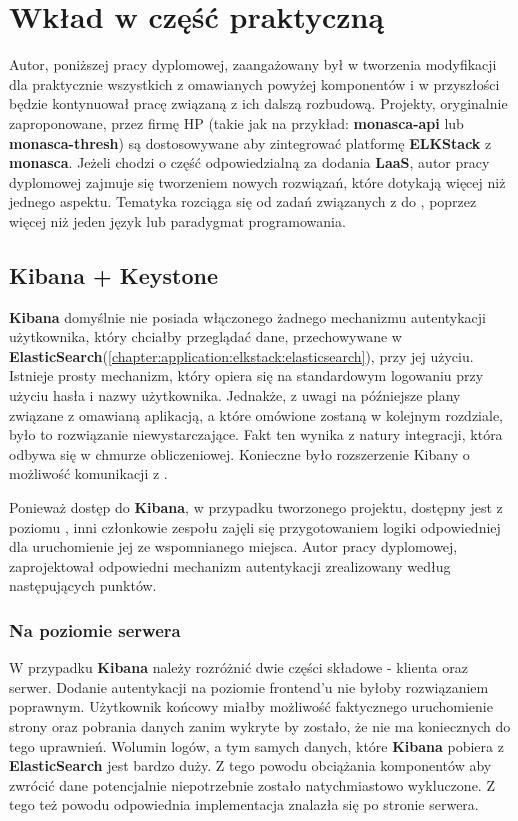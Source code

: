 \section{Wkład w część praktyczną}
\label{chapter:application:own_work}

Autor, poniższej pracy dyplomowej, zaangażowany był w tworzenia modyfikacji dla praktycznie wszystkich z omawianych powyżej komponentów i w przyszłości będzie kontynuował pracę związaną z ich dalszą rozbudową.
Projekty, oryginalnie zaproponowane, przez firmę HP (takie jak na przykład: \textbf{monasca-api} lub \textbf{monasca-thresh})
są dostosowywane aby zintegrować platformę \textbf{ELKStack} z \textbf{monasca}.
Jeżeli chodzi o część odpowiedzialną za dodania \textbf{LaaS}, autor pracy dyplomowej zajmuje się
tworzeniem nowych rozwiązań, które dotykają więcej niż jednego aspektu. Tematyka rozciąga się
od zadań związanych z  
do , poprzez więcej niż jeden język lub paradygmat programowania.

\subsection{Kibana + Keystone}
\label{chapter:application:own_work:kibana_and_keystone}

\textbf{Kibana} domyślnie nie posiada włączonego żadnego mechanizmu autentykacji użytkownika, który
chciałby przeglądać dane, przechowywane w \textbf{ElasticSearch}(\ref{chapter:application:elkstack:elasticsearch}), 
przy jej użyciu. Istnieje prosty mechanizm, który opiera się na standardowym logowaniu przy użyciu
hasła i nazwy użytkownika. Jednakże, z uwagi na późniejsze plany związane z omawianą aplikacją, a które 
omówione zostaną w kolejnym rozdziale, było to rozwiązanie niewystarczające. Fakt ten wynika z natury
integracji, która odbywa się w chmurze obliczeniowej. Konieczne było rozszerzenie Kibany o możliwość
komunikacji z .

Ponieważ dostęp do \textbf{Kibana}, w przypadku tworzonego projektu, dostępny jest z poziomu , inni
członkowie zespołu zajęli się przygotowaniem logiki odpowiedniej dla uruchomienie jej ze wspomnianego miejsca. Autor pracy 
dyplomowej, zaprojektował odpowiedni mechanizm autentykacji zrealizowany według następujących punktów.

    \subsubsection{Na poziomie serwera}
    W przypadku \textbf{Kibana} należy rozróżnić dwie części składowe - klienta oraz serwer. Dodanie autentykacji
    na poziomie frontend'u nie byłoby rozwiązaniem poprawnym. Użytkownik końcowy miałby możliwość faktycznego
    uruchomienie strony oraz pobrania danych zanim wykryte by zostało, że nie ma koniecznych do tego uprawnień.
    Wolumin logów, a tym samych danych, które \textbf{Kibana} pobiera z \textbf{ElasticSearch} jest bardzo duży.
    Z tego powodu obciążania komponentów aby zwrócić dane potencjalnie niepotrzebnie zostało
    natychmiastowo wykluczone. Z tego też powodu odpowiednia implementacja znalazła się po stronie serwera.
    
